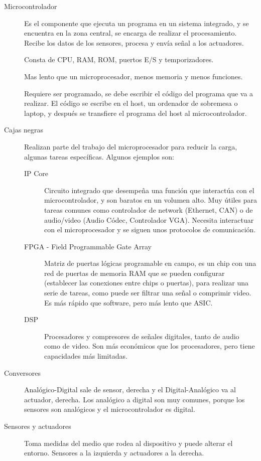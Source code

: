 \documentclass[12pt]{report} %
\begin{document}
\begin{description}
	\item[Microcontrolador] Es el componente que ejecuta un programa en un sistema integrado, y se encuentra en la zona central, se encarga de realizar el procesamiento. Recibe los datos de los sensores, procesa y envía señal a los actuadores.
	
	Consta de CPU, RAM, ROM, puertos E/S y temporizadores.
	
	Mas lento que un microprocesador, menos memoria y menos funciones.
	
	Requiere ser programado, se debe escribir el código del programa que va a realizar. El código se escribe en el host, un ordenador de sobremesa o laptop, y después se transfiere el programa del host al microcontrolador.
	\item[Cajas negras] Realizan parte del trabajo del microprocesador para reducir la carga, algunas tareas específicas. Algunos ejemplos son:
	\begin{description}
		\item[IP Core] Circuito integrado que desempeña una función que interactúa con el microcontrolador, y son baratos en un volumen alto. Muy útiles para tareas comunes como controlador de network (Ethernet, CAN)  o de audio/video (Audio Códec, Controlador VGA). Necesita interactuar con el microprocesador y se siguen unos protocolos de comunicación. 

		\item[FPGA - Field Programmable Gate Array] Matriz de puertas lógicas programable en campo, es un chip con una red de puertas de memoria RAM que se pueden configurar (establecer las conexiones entre chips o puertas), para realizar una serie de tareas, como puede ser filtrar una señal o comprimir video. Es más rápido que software, pero más lento que ASIC. 

		\item[DSP] Procesadores y compresores de señales digitales, tanto de audio como de video. Son más económicos que los procesadores, pero tiene capacidades más limitadas.

	\end{description}
	\item[Conversores] Analógico-Digital sale de sensor, derecha y el Digital-Analógico va al actuador, derecha. Los analógico a digital son muy comunes, porque los sensores son analógicos y el microcontrolador es digital.
	\item[Sensores y actuadores] Toma medidas del medio que rodea al dispositivo y puede alterar el entorno. Sensores a la izquierda y actuadores a la derecha.
\end{description}
\end{document}
